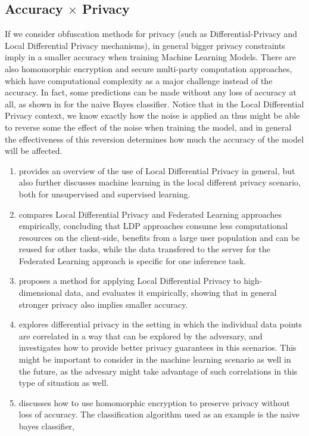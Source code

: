 \subsection{Accuracy $\times$ Privacy}

If we consider obfuscation methods for privacy (such as Differential-Privacy and Local Differential Privacy mechanisms), in general bigger privacy constraints imply in a smaller accuracy when training Machine Learning Models. There are also homomorphic encryption and secure multi-party computation approaches, which have computational complexity as a major challenge instead of the accuracy. In fact, some predictions can be made without any loss of accuracy at all, as shown in \cite{yang2005privacy} for the naive Bayes classifier. Notice that in the Local Differential Privacy context, we know exactly how the noise is applied an thus might be able to reverse some the effect of the noise when training the model, and in general the effectiveness of this reversion determines how much the accuracy of the model will be affected.

\begin{enumerate}
\item \cite{yang2023local} provides an overview of the use of Local Differential Privacy in general, but also further discusses machine learning in the local different privacy scenario, both for unsupervised and supervised learning.

\item \cite{zheng2020preserving} compares Local Differential Privacy and Federated Learning approaches empirically, concluding that LDP approaches consume less computational resources on the client-side, benefits from a large user population and can be reused for other tasks, while the data transfered to the server for the Federated Learning approach is specific for one inference task.
\item \cite{ren2018textsf} proposes a method for applying Local Differential Privacy to high-dimensional data, and evaluates it empirically, showing that in general stronger privacy also implies smaller accuracy.
\item \cite{liu2016dependence} explores differential privacy in the setting in which the individual data points are correlated in a way that can be explored by the adversary, and investigates how to provide better privacy guarantees in this scenarios. This might be important to consider in the machine learning scenario as well in the future, as the advesary might take advantage of such correlations in this type of situation as well.
\item \cite{yang2005privacy} discusses how to use homomorphic encryption to preserve privacy without loss of accuracy. The classification algorithm used as an example is the naive bayes classifier,
\end{enumerate}

